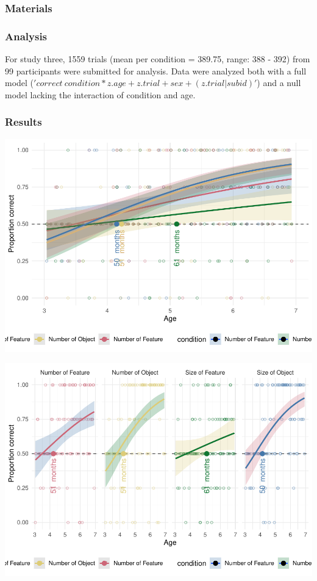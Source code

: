 \documentclass[
  man]{apa6}
\begin{document}
\subsubsection{Materials}\label{materials-1}

\subsubsection{Analysis}\label{analysis}

For study three, 1559 trials (mean per condition = 389.75, range: 388 - 392) from 99 participants were submitted for analysis. Data were analyzed both with a full model (\('correct~condition*z.age+z.trial+sex+(z.trial|subid)'\)) and a null model lacking the interaction of condition and age.

\subsubsection{Results}\label{results-2}

\includegraphics{symlit_rep_manuscript_files/figure-latex/S3_bayes_plot-1.pdf}

\includegraphics{symlit_rep_manuscript_files/figure-latex/S3_mixbayes_plot-1.pdf}
\end{document}
